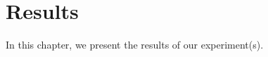\chapter{Results}

\label{ch:results}
In this chapter, we present the results of our experiment(s). 

